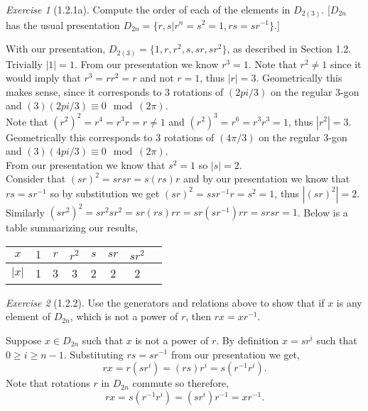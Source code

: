 \documentclass[12pt]{amsart}
\makeatletter
\theoremstyle{remark}
\newtheorem*{exercise}{Exercise}%
\renewenvironment{proof}[1][\proofname]{\par\doublespacing
  \pushQED{\qed}%
  \normalfont \topsep6\p@\@plus6\p@\relax
  \list{}{%
    \settowidth{\leftmargin}{\itshape\proofname:\hskip\labelsep}%
    \setlength{\labelwidth}{0pt}%
    \setlength{\itemindent}{-\leftmargin}%
  }%
  \item[\hskip\labelsep\itshape#1\@addpunct{:}]\ignorespaces
}{%
  \popQED\endlist\@endpefalse
  \singlespacing
}
\theoremstyle{mycomment}
\makeatother
\begin{document}
\begin{exercise}[1.2.1a] Compute the order of each of the elements in $D_{2(3)}$. [$D_{2n}$ has the usual presentation $D_{2n} = \{r, s | r^n = s^2 = 1, rs = sr^{-1}\}$.]
  \begin{proof}[Solution:] With our presentation, $D_{2(3)} = \{1, r, r^2, s, sr, sr^2\}$, as described in Section 1.2. 
    Trivially $|1| = 1$. 
    From our presentation we know $r^3 = 1$. Note that $r^2 \neq 1$ since it would imply that $r^3 = rr^2 = r$ and not $r = 1$, thus $|r| = 3$. Geometrically 
    this makes sense, since it corresponds to 3 rotations of $(2pi/3)$ on the regular 3-gon and $(3)(2pi/3) \equiv 0 \mod(2\pi)$. \\
    
    Note that $(r^2)^2 = r^4 = r^3r = r \neq 1$ and $(r^2)^3 = r^6 = r^3r^3 = 1$, thus $|r^2| = 3$. Geometrically this 
    corresponds to 3 rotations of $(4\pi/3)$ on the regular 3-gon and $(3)(4pi/3) \equiv 0 \mod(2\pi)$. \\
    
    From our presentation we know that $s^2 = 1$ so $|s| = 2$. \\
    
    Consider that $(sr)^2 = srsr = s(rs)r$ and by our presentation we know that $rs = sr^{-1}$ so by substitution we get $(sr)^2 = ssr^{-1}r = s^2 = 1$, thus $|(sr)^2| = 2$.\\ 
    
    Similarly $(sr^2)^2 = sr^2sr^2 = sr(rs)rr = sr (sr^{-1})rr = srsr = 1$. 
    Below is a table summarizing our results,
    \begin{center}
    \begin{tabular}{c | c c c c c c c} 
      $x$ & $1$ & $r$ & $r^2$ & $s$ & $sr$ & $sr^2$\\ 
      \hline
      $|x|$ & 1 & 3 & 3 & 2 & 2 & 2
    \end{tabular}
    \end{center}
  \end{proof}
\end{exercise}



\begin{exercise}[1.2.2] Use the generators and relations above to show that if $x$ is any element of $D_{2n}$, which is not a power of $r$, then $rx = xr^{-1}$. 
  \begin{proof} Suppose $x \in D_{2n}$ such that $x$ is not a power of $r$. By definition $x = sr^i$ such that $0 \geq i \geq n-1$. Substituting $rs = sr^{-1}$ from our presentation 
    we get, 
    \begin{equation*}
    rx = r(sr^i) = (rs)r^i = s(r^{-1}r^i). 
    \end{equation*}
    Note that rotations $r$ in $D_{2n}$ commute so therefore,
    \begin{equation*}
    rx = s(r^{-1}r^i) = (sr^i)r^{-1} = xr^{-1}.
    \end{equation*}
  \end{proof}
\end{exercise}
\end{document}

